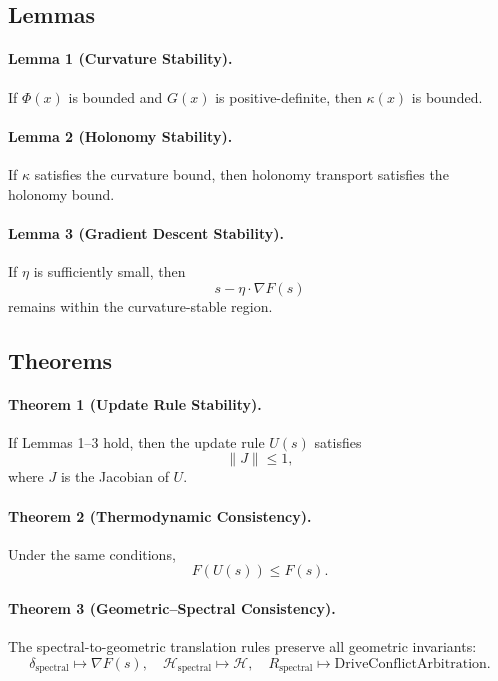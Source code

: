 \subsection{Lemmas}

\paragraph{Lemma 1 (Curvature Stability).}
If $\Phi(x)$ is bounded and $G(x)$ is positive-definite, then $\kappa(x)$ is
bounded.

\paragraph{Lemma 2 (Holonomy Stability).}
If $\kappa$ satisfies the curvature bound, then holonomy transport satisfies the
holonomy bound.

\paragraph{Lemma 3 (Gradient Descent Stability).}
If $\eta$ is sufficiently small, then
\[
s - \eta \cdot \nabla F(s)
\]
remains within the curvature-stable region.

\subsection{Theorems}

\paragraph{Theorem 1 (Update Rule Stability).}
If Lemmas 1–3 hold, then the update rule $U(s)$ satisfies
\[
\|J\| \le 1,
\]
where $J$ is the Jacobian of $U$.

\paragraph{Theorem 2 (Thermodynamic Consistency).}
Under the same conditions,
\[
F(U(s)) \le F(s).
\]

\paragraph{Theorem 3 (Geometric–Spectral Consistency).}
The spectral-to-geometric translation rules preserve all geometric invariants:
\[
\delta_{\text{spectral}} \mapsto \nabla F(s),
\quad
\mathcal{H}_{\text{spectral}} \mapsto \mathcal{H},
\quad
R_{\text{spectral}} \mapsto \mathrm{DriveConflictArbitration}.
\]

